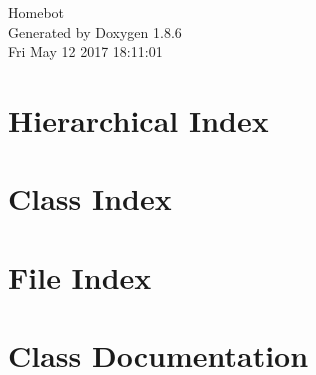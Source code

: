 \documentclass[twoside]{book}
\newcommand{\clearemptydoublepage}{%
  \newpage{\pagestyle{empty}\cleardoublepage}%
}
\begin{document}
\hypersetup{pageanchor=false}
\begin{titlepage}
\vspace*{7cm}
\begin{center}%
{\Large Homebot }\\
\vspace*{1cm}
{\large Generated by Doxygen 1.8.6}\\
\vspace*{0.5cm}
{\small Fri May 12 2017 18:11:01}\\
\end{center}
\end{titlepage}
\clearemptydoublepage
\tableofcontents
\clearemptydoublepage
{}
\hypersetup{pageanchor=true}

\chapter{Hierarchical Index}

\chapter{Class Index}

\chapter{File Index}

\chapter{Class Documentation}

















\end{document}

